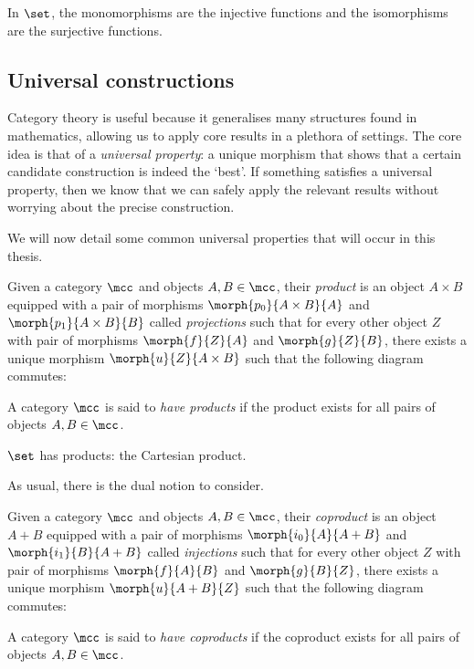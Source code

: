 \begin{example}
    In \(\set\), the monomorphisms are the injective functions and the
    isomorphisms are the surjective functions.
\end{example}

\subsection{Universal constructions}

Category theory is useful because it generalises many structures found in
mathematics, allowing us to apply core results in a plethora of settings.
The core idea is that of a \emph{universal property}: a unique morphism that
shows that a certain candidate construction is indeed the `best'.
If something satisfies a universal property, then we know that we can safely
apply the relevant results without worrying about the precise construction.

We will now detail some common universal properties that will occur in this
thesis.

\begin{definition}[Product]
    Given a category \(\mcc\) and objects \(A,B \in \mcc\), their \emph{product}
    is an object \(A \times B\) equipped with a pair of morphisms
    \(\morph{p_0}{A \times B}{A}\) and \(\morph{p_1}{A \times B}{B}\) called
    \emph{projections} such that for every other object \(Z\) with pair of
    morphisms \(\morph{f}{Z}{A}\) and \(\morph{g}{Z}{B}\), there exists a unique
    morphism \(\morph{u}{Z}{A \times B}\) such that the following diagram
    commutes:
    \begin{center}
        
    \end{center}
    A category \(\mcc\) is said to \emph{have products} if the product exists
    for all pairs of objects \(A,B \in \mcc\).
\end{definition}

\begin{example}
    \(\set\) has products: the Cartesian product.
\end{example}

As usual, there is the dual notion to consider.

\begin{definition}[Coproduct]
    Given a category \(\mcc\) and objects \(A,B \in \mcc\), their \emph{coproduct}
    is an object \(A + B\) equipped with a pair of morphisms
    \(\morph{i_0}{A}{A + B}\) and \(\morph{i_1}{B}{A + B}\) called
    \emph{injections} such that for every other object \(Z\) with pair of
    morphisms \(\morph{f}{A}{B}\) and \(\morph{g}{B}{Z}\), there exists a unique
    morphism \(\morph{u}{A + B}{Z}\) such that the following diagram
    commutes:
    \begin{center}
        
    \end{center}
    A category \(\mcc\) is said to \emph{have coproducts} if the coproduct
    exists for all pairs of objects \(A,B \in \mcc\).
\end{definition}

